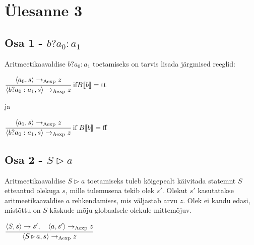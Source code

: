 \section{Ülesanne 3}
\subsection{Osa 1 - \(b?a_0:a_1\)}

Aritmeetikaavaldise \(b?a_0:a_1\) toetamiseks on tarvis lisada järgmised reeglid:

\(
\cfrac
  {\langle a_0,s \rangle \rightarrow _\mathrm{Aexp} z}
  {\langle b?a_0:a_1,s \rangle  \rightarrow _\mathrm{Aexp} z}
  \;
  \text{if}  B\llbracket b \rrbracket = \text{tt}
\)

ja

\(
\cfrac
  {\langle a_1,s \rangle \rightarrow _\mathrm{Aexp} z}
  {\langle b?a_0:a_1,s \rangle  \rightarrow _\mathrm{Aexp} z}
  \;
  \text{if} \; B\llbracket b \rrbracket = \text{ff}
\)

\subsection{Osa 2 - \(S \triangleright a \)}

Aritmeetikaavaldise \(S \triangleright a \) toetamiseks tuleb kõigepealt
käivitada statemnt \(S\) etteantud olekuga \(s\), mille tulemusena tekib olek
\(s'\).  Olekut \(s'\) kasutatakse aritmeetikaavaldise \(a\) rehkendamises, mis
väljastab arvu \(z\). Olek ei kandu edasi, mistõttu on \(S\) käskude mõju
globaalsele olekule mittemõjuv.

\vspace*{8pt}

\(
\cfrac
  {\langle S,s \rangle \rightarrow s', \quad \langle a, s' \rangle \rightarrow _\mathrm{Aexp} z}
  {\langle S \triangleright a,s \rangle  \rightarrow _\mathrm{Aexp} z}
\)


